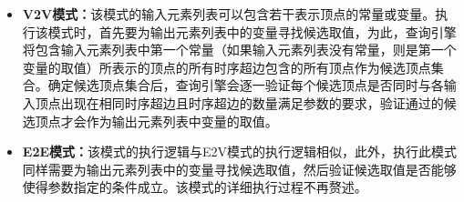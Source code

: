 \begin{itemize}
    \item \textbf{V2V模式：}该模式的输入元素列表可以包含若干表示顶点的常量或变量。执行该模式时，首先要为输出元素列表中的变量寻找候选取值，为此，查询引擎将包含输入元素列表中第一个常量（如果输入元素列表没有常量，则是第一个变量的取值）所表示的顶点的所有时序超边包含的所有顶点作为候选顶点集合。确定候选顶点集合后，查询引擎会逐一验证每个候选顶点是否同时与各输入顶点出现在相同时序超边且时序超边的数量满足参数的要求，验证通过的候选顶点才会作为输出元素列表中变量的取值。
    \item \textbf{E2E模式：}该模式的执行逻辑与E2V模式的执行逻辑相似，此外，执行此模式同样需要为输出元素列表中的变量寻找候选取值，然后验证候选取值是否能够使得参数指定的条件成立。该模式的详细执行过程不再赘述。
\end{itemize}